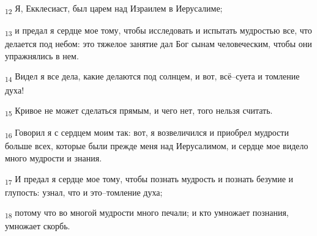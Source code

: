 \begin{tcolorbox}
\textsubscript{12} Я, Екклесиаст, был царем над Израилем в Иерусалиме;
\end{tcolorbox}
\begin{tcolorbox}
\textsubscript{13} и предал я сердце мое тому, чтобы исследовать и испытать мудростью все, что делается под небом: это тяжелое занятие дал Бог сынам человеческим, чтобы они упражнялись в нем.
\end{tcolorbox}
\begin{tcolorbox}
\textsubscript{14} Видел я все дела, какие делаются под солнцем, и вот, всё--суета и томление духа!
\end{tcolorbox}
\begin{tcolorbox}
\textsubscript{15} Кривое не может сделаться прямым, и чего нет, того нельзя считать.
\end{tcolorbox}
\begin{tcolorbox}
\textsubscript{16} Говорил я с сердцем моим так: вот, я возвеличился и приобрел мудрости больше всех, которые были прежде меня над Иерусалимом, и сердце мое видело много мудрости и знания.
\end{tcolorbox}
\begin{tcolorbox}
\textsubscript{17} И предал я сердце мое тому, чтобы познать мудрость и познать безумие и глупость: узнал, что и это--томление духа;
\end{tcolorbox}
\begin{tcolorbox}
\textsubscript{18} потому что во многой мудрости много печали; и кто умножает познания, умножает скорбь.
\end{tcolorbox}

